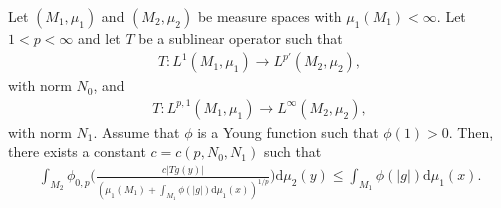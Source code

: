 \documentclass[10pt,a4paper]{amsart}
\def\d{\mathrm{d}}
\begin{document}
\begin{thm}
    \label{interpolation}
    Let $(M_1, \mu_1)$ and $(M_2, \mu_2)$ be measure spaces with $\mu_1(M_1)<\infty$. Let   $1<p<\infty$ and let $T$ be a sublinear operator such that
    \begin{align}
        \label{inter1}
        T: L^{1}(M_1, \mu_1) \to L^{p'}(M_2,\mu_2),
    \end{align}
    with norm $N_0$, 
    and
    \begin{align}
        \label{inter2}
        T: L^{p,1}(M_1, \mu_1) \to L^{\infty}(M_2,\mu_2),
    \end{align}
    with norm $N_1$. Assume that $\phi$ is a Young function such that $\phi(1)>0$.
    Then, there exists a constant $c=c(p, N_0, N_1)$ such that
    \begin{align}
        \label{inter3}
        \int_{M_2}  \phi_{0,p}\Bigg(\frac{c|Tg(y)|}{(\mu_1(M_1)+ \int_{M_1} \phi(|g|)\d \mu_1(x))^{1/p}}\Bigg)\d \mu_2(y) \leq \int_{M_1} \phi(|g|)\d \mu_1(x).
    \end{align}
\end{thm}
\end{document}
